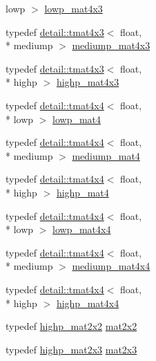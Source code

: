 \begin{DoxyCompactItemize}
lowp $>$ \hyperlink{group__core__precision_gada92d0baf15002240dd6f638c57f9fec}{lowp\-\_\-mat4x3}
\item 
typedef \hyperlink{structglm_1_1detail_1_1tmat4x3}{detail\-::tmat4x3}$<$ float, \\*
mediump $>$ \hyperlink{group__core__precision_ga445d8aac3a5227af2d1e98d5c2f74d03}{mediump\-\_\-mat4x3}
\item 
typedef \hyperlink{structglm_1_1detail_1_1tmat4x3}{detail\-::tmat4x3}$<$ float, \\*
highp $>$ \hyperlink{group__core__precision_gab8dfe989c5100c35ab5dec0e94f59d2a}{highp\-\_\-mat4x3}
\item 
typedef \hyperlink{structglm_1_1detail_1_1tmat4x4}{detail\-::tmat4x4}$<$ float, \\*
lowp $>$ \hyperlink{group__core__precision_ga8f6fef75ce51e9d6db7971478ad1f1c2}{lowp\-\_\-mat4}
\item 
typedef \hyperlink{structglm_1_1detail_1_1tmat4x4}{detail\-::tmat4x4}$<$ float, \\*
mediump $>$ \hyperlink{group__core__precision_gaf3de9a0400cf707d3c159f32902b92db}{mediump\-\_\-mat4}
\item 
typedef \hyperlink{structglm_1_1detail_1_1tmat4x4}{detail\-::tmat4x4}$<$ float, \\*
highp $>$ \hyperlink{group__core__precision_ga3067b3b8ce793227a51b2e3c233257d5}{highp\-\_\-mat4}
\item 
typedef \hyperlink{structglm_1_1detail_1_1tmat4x4}{detail\-::tmat4x4}$<$ float, \\*
lowp $>$ \hyperlink{group__core__precision_gad31846a0565c22a0479950313c28b218}{lowp\-\_\-mat4x4}
\item 
typedef \hyperlink{structglm_1_1detail_1_1tmat4x4}{detail\-::tmat4x4}$<$ float, \\*
mediump $>$ \hyperlink{group__core__precision_gacb51d2d10f7607617ac544f6db9a6eef}{mediump\-\_\-mat4x4}
\item 
typedef \hyperlink{structglm_1_1detail_1_1tmat4x4}{detail\-::tmat4x4}$<$ float, \\*
highp $>$ \hyperlink{group__core__precision_ga231950d260be295a25d7340e2020f55c}{highp\-\_\-mat4x4}
\item 
typedef \hyperlink{group__core__precision_ga694146b8d430b22caa8b37571d9bc8bc}{highp\-\_\-mat2x2} \hyperlink{group__core__types_gaeddc14adb4963d9bad73866cc202fb40}{mat2x2}
\item 
typedef \hyperlink{group__core__precision_ga7d4e5a1c803be5688c75241c924dfa58}{highp\-\_\-mat2x3} \hyperlink{group__core__types_gaea02797b8231f6dd9380345f6ff12155}{mat2x3}

\end{DoxyCompactItemize}
